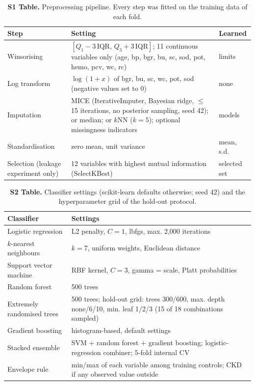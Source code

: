 \begin{table}[!ht]\centering\small
\caption{{\bf S1 Table.} Preprocessing pipeline. Every step was fitted on the training data of each fold.}
\begin{tabular}{p{3.2cm}p{9cm}p{1.8cm}}\toprule
Step & Setting & Learned\\\midrule
Winsorising & $[Q_1-3\,\mathrm{IQR},\,Q_3+3\,\mathrm{IQR}]$; 11 continuous variables only (age, bp, bgr, bu, sc, sod, pot, hemo, pcv, wc, rc) & limits\\
Log transform & $\log(1+x)$ of bgr, bu, sc, wc, pot, sod (negative values set to 0) & none\\
Imputation & MICE (IterativeImputer, Bayesian ridge, $\le$15 iterations, no posterior sampling, seed 42); or median; or $k$NN ($k=5$); optional missingness indicators & models\\
Standardisation & zero mean, unit variance & mean, s.d.\\
Selection (leakage experiment only) & 12 variables with highest mutual information (SelectKBest) & selected set\\
\bottomrule\end{tabular}\end{table}

\begin{table}[!ht]\centering\small
\caption{{\bf S2 Table.} Classifier settings (scikit-learn defaults otherwise; seed 42) and the hyperparameter grid of the hold-out protocol.}
\begin{tabular}{p{3.6cm}p{10.4cm}}\toprule
Classifier & Settings\\\midrule
Logistic regression & L2 penalty, $C=1$, lbfgs, max. 2,000 iterations\\
$k$-nearest neighbours & $k=7$, uniform weights, Euclidean distance\\
Support vector machine & RBF kernel, $C=3$, gamma = scale, Platt probabilities\\
Random forest & 500 trees\\
Extremely randomised trees & 500 trees; hold-out grid: trees 300/600, max. depth none/6/10, min. leaf 1/2/3 (15 of 18 combinations sampled)\\
Gradient boosting & histogram-based, default settings\\
Stacked ensemble & SVM + random forest + gradient boosting; logistic-regression combiner; 5-fold internal CV\\
Envelope rule & min/max of each variable among training controls; CKD if any observed value outside\\
\bottomrule\end{tabular}\end{table}

